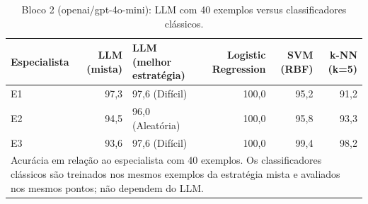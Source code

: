 \begin{table}[htbp]
\centering
\small
\caption{Bloco 2 (openai/gpt-4o-mini): LLM com 40 exemplos versus classificadores clássicos.}
\label{tab:bloco2_E_LLM_vs_baselines_40shot_gpt4mini}
\begin{tabular}{lrlrrr}
\toprule
Especialista & LLM (mista) & LLM (melhor estratégia) & Logistic Regression & SVM (RBF) & k-NN (k=5) \\
\midrule
E1 & 97,3 & 97,6 (Difícil) & 100,0 & 95,2 & 91,2 \\
E2 & 94,5 & 96,0 (Aleatória) & 100,0 & 95,8 & 93,3 \\
E3 & 93,6 & 97,6 (Difícil) & 100,0 & 99,4 & 98,2 \\
\bottomrule
\multicolumn{6}{p{0.95\linewidth}}{\footnotesize Acurácia em relação ao especialista com 40 exemplos. Os classificadores clássicos são treinados nos mesmos exemplos da estratégia mista e avaliados nos mesmos pontos; não dependem do LLM.} \\
\end{tabular}
\end{table}
